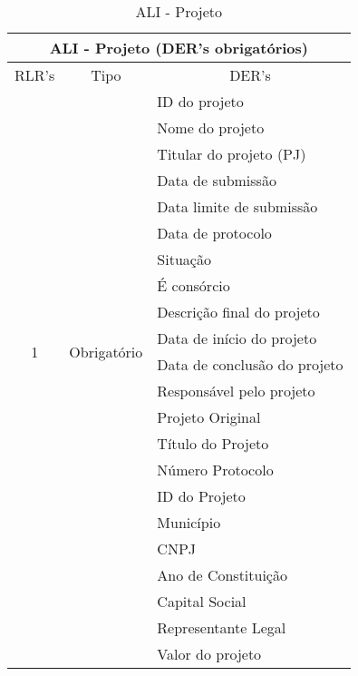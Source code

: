 	  \begin{table}[!h]
	  \centering
	  \caption{ALI - Projeto}
	  \label{ali_projeto}
	  \begin{tabular}{|c|c|l|}
	  \hline
	  \multicolumn{3}{|c|}{\textbf{ALI - Projeto (DER's obrigatórios)}}                                                      \\ \hline
	  \multicolumn{1}{|l|}{RLR's} & Tipo                         & \multicolumn{1}{c|}{DER's}  \\ \hline
	  \multirow{20}{*}{1}  &\multirow{20}{*}{Obrigatório} & ID do projeto               \\ \cline{3-3} 
			      &                              & Nome do projeto             \\ \cline{3-3} 
			      &                              & Titular do projeto (PJ)     \\ \cline{3-3} 
			      &                              & Data de submissão           \\ \cline{3-3}
			      &				     & Data limite de submissão    \\ \cline{3-3}
			      &                              & Data de protocolo           \\ \cline{3-3} 
			      &                              & Situação                    \\ \cline{3-3} 
			      &                              & É consórcio                 \\ \cline{3-3} 
			      &                              & Descrição final do projeto          \\ \cline{3-3} 
			      &                              & Data de início do projeto                  \\ \cline{3-3} 
			      &                              & Data de conclusão do projeto                 \\ \cline{3-3}
			      &                              & Responsável pelo projeto    \\ \cline{3-3}
			      &   & Projeto Original               \\ \cline{3-3}
			      &   & Título do Projeto                                   \\ \cline{3-3}
			      &   & Número Protocolo                                    \\ \cline{3-3}
			      &   & ID do Projeto                                       \\ \cline{3-3}
			      &   & Município                                           \\ \cline{3-3}
			      &   & CNPJ                                                \\ \cline{3-3}
			      &   & Ano de Constituição                                 \\ \cline{3-3}
			      &   & Capital Social                                      \\ \cline{3-3}
			      &   & Representante Legal                                 \\ \cline{3-3}
			      &   & Valor do projeto                                    \\ \cline{3-3}


\end{tabular}
\end{table}
